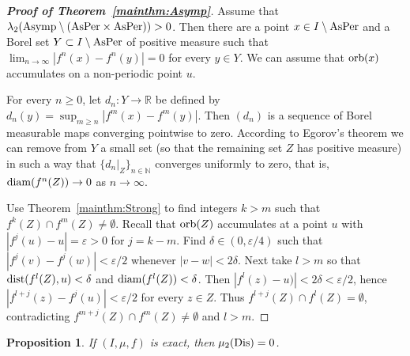 \documentclass[12pt, psamsfonts, reqno]{amsart}
\newtheorem{proposition}[theorem]{Proposition}
\begin{document}
\iffalse
\begin{proposition}
 \label{prop:Asymp}
If $f\in {C^2_{\text{\rm nf}}}(I)$, then
 $\lambda_2({\mathop{\rm Asymp}\nolimits} \setminus ({\mathop{\rm AsPer}\nolimits}\times {\mathop{\rm AsPer}\nolimits})) = 0$.
\end{proposition}
\fi

\begin{proof}[\textbf{Proof of Theorem~\ref{mainthm:Asymp}}]
 Assume that $\lambda_2({\mathop{\rm Asymp}\nolimits} \setminus ({\mathop{\rm AsPer}\nolimits}\times {\mathop{\rm AsPer}\nolimits})) > 0$.
Then there are a point
 $x\in I\setminus {\mathop{\rm AsPer}\nolimits}$ and a Borel set $Y\subset I\setminus
 {\mathop{\rm AsPer}\nolimits}$ of
 positive measure such that $\lim_{n\to \infty}
 |f^n(x)-f^n(y)|=0$ for every $y\in Y$. We can assume that ${\mathop{\rm orb}\nolimits}(x)$
 accumulates on a non-periodic point $u$.

 For every $n \geq 0$, let $d_n:Y\to {{\mathbb R}}$ be defined by
 $d_n(y)=\sup_{m\geq n} |f^m(x)-f^m(y)|$. Then $(d_n)$ is a
 sequence of Borel measurable maps converging pointwise to zero.
 According to Egorov's theorem we can remove from $Y$ a small set
 (so that the remaining set $Z$ has positive measure) in such a way
 that $\{ d_n|_Z \}_{n \in {{\mathbb N}}}$ converges uniformly to zero, that is,
 ${\mathop{\rm diam}\nolimits}(f^n(Z))\to 0$ as $n\to \infty$.

Use Theorem~\ref{mainthm:Strong} to find integers $k>m$ such that
 $f^k(Z)\cap f^m(Z)\neq \emptyset$. Recall that ${\mathop{\rm orb}\nolimits}(Z)$ accumulates at
 a point $u$ with $|f^j(u)-u|={\varepsilon}>0$ for $j=k-m$. Find
$\delta \in (0, {\varepsilon}/4)$ such that
 $|f^j(v)-f^j(w)|<{\varepsilon}/2$ whenever $|v-w|<2\delta$. Next take
 $l>m$ so that ${\mathop{\rm dist}\nolimits}(f^l(Z),u)<\delta$ and ${\mathop{\rm diam}\nolimits}(f^l(Z))<\delta$.
 Then $|f^l(z)-u)|<2\delta<{\varepsilon}/2$, hence
 $|f^{l+j}(z)-f^j(u)|<{\varepsilon}/2$ for every $z\in Z$. Thus
 $f^{l+j}(Z)\cap f^l(Z)=\emptyset$, contradicting $f^{m+j}(Z)\cap
 f^m(Z)\neq \emptyset$ and $l>m$.
\end{proof}

\begin{proposition}\label{PropExactDis}
 If $(I,\mu,f)$ is exact, then $\mu_2({\mathop{\rm Dis}\nolimits})=0$.
\end{proposition}
\end{document}
